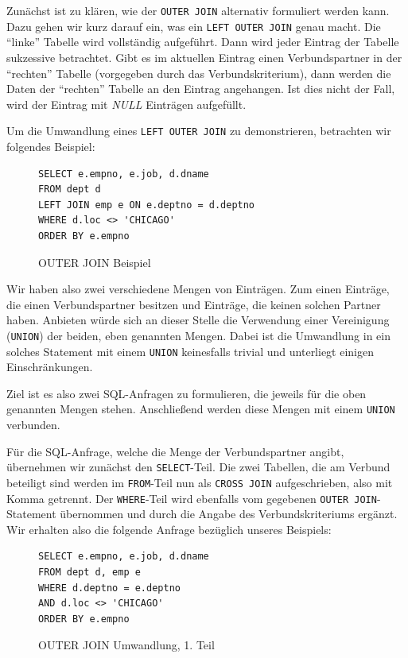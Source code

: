Zunächst ist zu klären, wie der \verb|OUTER JOIN| alternativ formuliert werden kann. Dazu gehen wir kurz darauf ein, was ein \verb|LEFT OUTER JOIN| genau macht. Die ``linke'' Tabelle wird vollständig aufgeführt. Dann wird jeder Eintrag der Tabelle sukzessive betrachtet. Gibt es im aktuellen Eintrag einen Verbundspartner in der ``rechten'' Tabelle (vorgegeben durch das Verbundskriterium), dann werden die Daten der ``rechten'' Tabelle an den Eintrag angehangen. Ist dies nicht der Fall, wird der Eintrag mit \textit{NULL} Einträgen aufgefüllt. 

Um die Umwandlung eines \verb|LEFT OUTER JOIN| zu demonstrieren, betrachten wir folgendes Beispiel:

\begin{figure}[h]
\begin{verbatim}
SELECT e.empno, e.job, d.dname 
FROM dept d 
LEFT JOIN emp e ON e.deptno = d.deptno 
WHERE d.loc <> 'CHICAGO'
ORDER BY e.empno
\end{verbatim}
\caption{OUTER JOIN Beispiel}
\end{figure}

Wir haben also zwei verschiedene Mengen von Einträgen. Zum einen Einträge, die einen Verbundspartner besitzen und Einträge, die keinen solchen Partner haben. Anbieten würde sich an dieser Stelle die Verwendung einer Vereinigung (\verb|UNION|) der beiden, eben genannten Mengen. Dabei ist die Umwandlung in ein solches Statement mit einem \verb|UNION| keinesfalls trivial und unterliegt einigen Einschränkungen. 

Ziel ist es also zwei SQL-Anfragen zu formulieren, die jeweils für die oben genannten Mengen stehen. Anschließend werden diese Mengen mit einem \verb|UNION| verbunden.

Für die SQL-Anfrage, welche die Menge der Verbundspartner angibt, übernehmen wir zunächst den \verb|SELECT|-Teil. Die zwei Tabellen, die am Verbund beteiligt sind werden im \verb|FROM|-Teil nun als \verb|CROSS JOIN| aufgeschrieben, also mit Komma getrennt. Der \verb|WHERE|-Teil wird ebenfalls vom gegebenen \verb|OUTER JOIN|-Statement übernommen und durch die Angabe des Verbundskriteriums ergänzt.
Wir erhalten also die folgende Anfrage bezüglich unseres Beispiels:

\begin{figure}[h]
\begin{verbatim}
SELECT e.empno, e.job, d.dname 
FROM dept d, emp e
WHERE d.deptno = e.deptno
AND d.loc <> 'CHICAGO'
ORDER BY e.empno
\end{verbatim}
\caption{OUTER JOIN Umwandlung, 1. Teil}
\end{figure}

